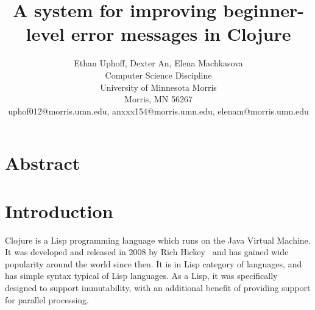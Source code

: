 \documentclass[12pt]{article}
\newcommand{\comment}[1]{{\bf \tt  {#1}}}
\newcommand{\emcomment}[1]{\textcolor{ForestGreen}{\comment{Elena: {#1}}}}
\begin{document}
\pagestyle{plain}
%

\title{A system for improving beginner-level error messages in Clojure}
%
%

\author{
Ethan Uphoff, Dexter An, Elena Machkasova \\
Computer Science Discipline \\
University of Minnesota Morris\\
Morris, MN 56267\\
uphof012@morris.umn.edu, anxxx154@morris.umn.edu, elenam@morris.umn.edu
}
\maketitle
\thispagestyle{empty}

\section*{\centering Abstract}


\newpage
\setcounter{page}{1}

\section{Introduction}
Clojure is a Lisp programming language which runs on the Java Virtual Machine. It was developed and released in 2008 by Rich Hickey~\cite{Hickey:2008} and has gained 
wide popularity around the world since then. It is in Lisp category of languages, and has simple syntax typical of Lisp languages. As a Lisp, it was specifically designed to support
immutability, with an additional benefit of providing support for parallel processing. 
\end{document}
